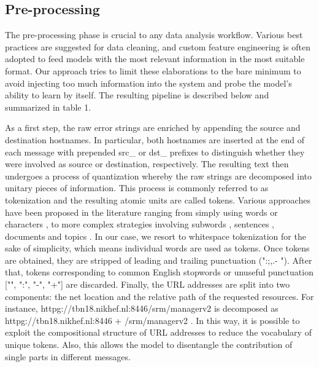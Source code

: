 \subsection{Pre-processing}


The pre-processing phase is crucial to any data analysis workflow. Various best practices are suggested for data cleaning, and custom feature engineering is often adopted to feed models with the most relevant information in the most suitable format.
Our approach tries to limit these elaborations to the bare minimum to avoid injecting too much information into the system and probe the model's ability to learn by itself.
The resulting pipeline is described below and summarized in table 1.

As a first step, the raw error strings are enriched by appending the source and destination hostnames. In particular, both hostnames are inserted at the end of each message with prepended src\_ or dst\_ prefixes to distinguish whether they were involved as source or destination, respectively.
The resulting text then undergoes a process of quantization whereby the raw strings are decomposed into unitary pieces of information.
This process is commonly referred to as tokenization and the resulting atomic units are called tokens. Various approaches have been proposed in the literature ranging from simply using words \cite{bengio2003word, mccann2017word} or characters \cite{ling2015char, dhingra2016char}, to more complex strategies involving subwords \cite{gage1994subword, sennrich2016subword}, sentences \cite{kiros2015sentence}, documents \cite{le2014documents} and topics \cite{niu2015topic}. 
In our case, we resort to whitespace tokenization for the sake of simplicity, which means individual words are used as tokens.
Once tokens are obtained, they are stripped of leading and trailing punctuation (":;,.- ").
After that, tokens corresponding to common English stopwords or unuseful punctuation ["", ":", "-", "+"] are discarded.
Finally, the URL addresses are split into two components: the net location and the relative path of the requested resources. For instance, httpg://tbn18.nikhef.nl:8446/srm/managerv2 is decomposed as httpg://tbn18.nikhef.nl:8446 + /srm/managerv2 .
In this way, it is possible to exploit the compositional structure of URL addresses to reduce the vocabulary of unique tokens. Also, this allows the model to disentangle the contribution of single parts in different messages.
